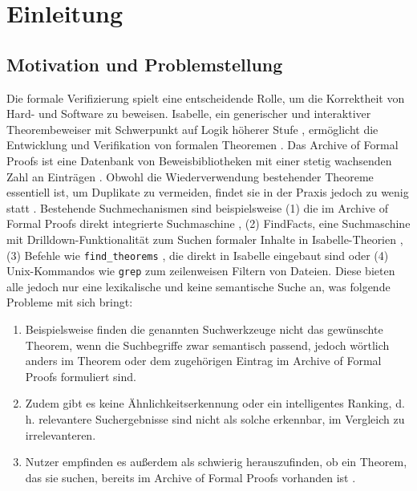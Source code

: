 \documentclass[12pt,letterpaper]{article} %
\begin{document}

\section{Einleitung}

\subsection{Motivation und Problemstellung}
Die formale Verifizierung spielt eine entscheidende Rolle, um die Korrektheit von Hard- und Software zu beweisen.
Isabelle, ein generischer und interaktiver Theorembeweiser mit Schwerpunkt auf Logik höherer Stufe \citep[S. 1]{blanchette_isabelle_nodate}, ermöglicht die Entwicklung und Verifikation von formalen Theoremen \citep[S. 3, S. 9]{nipkow_isabellehol_2002}.
Das Archive of Formal Proofs ist eine Datenbank von Beweisbibliotheken mit einer stetig wachsenden Zahl an Einträgen \citep[S. 2-3]{blanchette_mining_2015}.
Obwohl die Wiederverwendung bestehender Theoreme essentiell ist, um Duplikate zu vermeiden, findet sie in der Praxis jedoch zu wenig statt \citep[S. 13]{blanchette_mining_2015}.
Bestehende Suchmechanismen sind beispielsweise (1) die im Archive of Formal Proofs direkt integrierte Suchmaschine \citep[S. 3]{mackenzie_re-imagining_2022}, (2) FindFacts, eine Suchmaschine mit Drilldown-Funktionalität zum Suchen formaler Inhalte in Isabelle-Theorien \citep{huch_findfacts_2022}, (3) Befehle wie \texttt{find\_theorems} \citep[S. 68]{wenzel_isabelleisar_nodate}, die direkt in Isabelle eingebaut sind oder (4) Unix-Kommandos wie \texttt{grep} zum zeilenweisen Filtern von Dateien.
Diese bieten alle jedoch nur eine lexikalische und keine semantische Suche an, was folgende Probleme mit sich bringt:
\begin{enumerate}
  \item Beispielsweise finden die genannten Suchwerkzeuge nicht das gewünschte Theorem, wenn die Suchbegriffe zwar semantisch passend, jedoch wörtlich anders im Theorem oder dem zugehörigen Eintrag im Archive of Formal Proofs formuliert sind. %

  \item Zudem gibt es keine Ähnlichkeitserkennung oder ein intelligentes Ranking, d. h. relevantere Suchergebnisse sind nicht als solche erkennbar, im Vergleich zu irrelevanteren.

  \item Nutzer empfinden es außerdem als schwierig herauszufinden, ob ein Theorem, das sie suchen, bereits im Archive of Formal Proofs vorhanden ist \citep[S. 6]{mackenzie_evaluation_2021}.
\end{enumerate}
\end{document}
